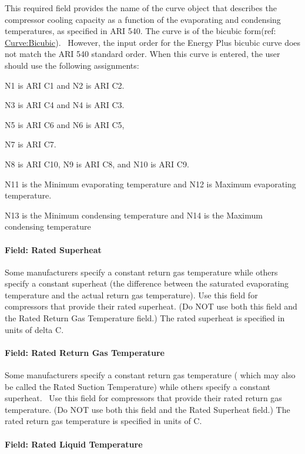 This required field provides the name of the curve object that describes the compressor cooling capacity as a function of the evaporating and condensing temperatures, as specified in ARI 540. The curve is of the bicubic form(ref: \hyperref[curvebicubic]{Curve:Bicubic}).~ However, the input order for the Energy Plus bicubic curve does not match the ARI 540 standard order. When this curve is entered, the user should use the following assignments:

N1 is ARI C1 and N2 is ARI C2.

N3 is ARI C4 and N4 is ARI C3.

N5 is ARI C6 and N6 is ARI C5,

N7 is ARI C7.

N8 is ARI C10, N9 is ARI C8, and N10 is ARI C9.

N11 is the Minimum evaporating temperature and N12 is Maximum evaporating temperature.

N13 is the Minimum condensing temperature and N14 is the Maximum condensing temperature

\paragraph{Field: Rated Superheat}\label{field-rated-superheat}

Some manufacturers specify a constant return gas temperature while others specify a constant superheat (the difference between the saturated evaporating temperature and the actual return gas temperature). Use this field for compressors that provide their rated superheat. (Do NOT use both this field and the Rated Return Gas Temperature field.) The rated superheat is specified in units of delta C.

\paragraph{Field: Rated Return Gas Temperature}\label{field-rated-return-gas-temperature}

Some manufacturers specify a constant return gas temperature ( which may also be called the Rated Suction Temperature) while others specify a constant superheat.~ Use this field for compressors that provide their rated return gas temperature. (Do NOT use both this field and the Rated Superheat field.) The rated return gas temperature is specified in units of C.

\paragraph{Field: Rated Liquid Temperature}\label{field-rated-liquid-temperature}

